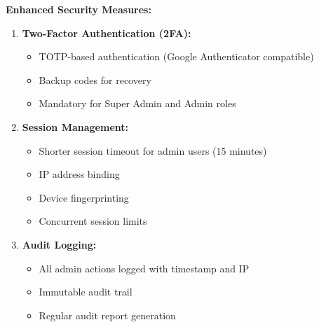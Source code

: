 \textbf{Enhanced Security Measures:}

\begin{enumerate}
    \item \textbf{Two-Factor Authentication (2FA):}
    \begin{itemize}
        \item TOTP-based authentication (Google Authenticator compatible)
        \item Backup codes for recovery
        \item Mandatory for Super Admin and Admin roles
    \end{itemize}
    
    \item \textbf{Session Management:}
    \begin{itemize}
        \item Shorter session timeout for admin users (15 minutes)
        \item IP address binding
        \item Device fingerprinting
        \item Concurrent session limits
    \end{itemize}
    
    \item \textbf{Audit Logging:}
    \begin{itemize}
        \item All admin actions logged with timestamp and IP
        \item Immutable audit trail
        \item Regular audit report generation
    \end{itemize}
\end{enumerate}

